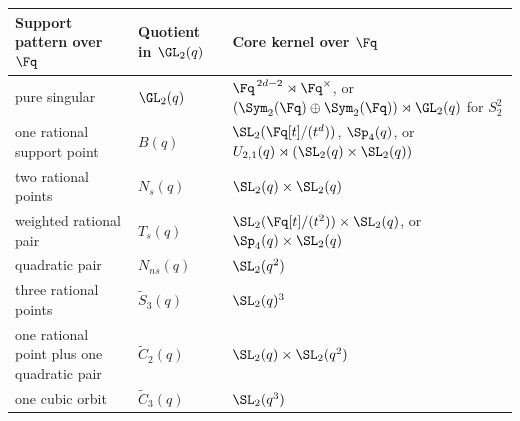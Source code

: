 \begin{tabular}{L{0.22\textwidth} L{0.22\textwidth} L{0.36\textwidth}}
\toprule
Support pattern over \(\Fq\) & Quotient in \(\GL_2(q)\) & Core kernel over \(\Fq\) \\
\midrule
pure singular &
\(\GL_2(q)\) &
\(\Fq^{\,2d-2}\rtimes \Fq^\times\), or
\((\Sym_2(\Fq)\oplus \Sym_2(\Fq))\rtimes \GL_2(q)\) for \(S_2^2\) \\
one rational support point &
\(B(q)\) &
\(\SL_2(\Fq[t]/(t^d))\), \(\Sp_4(q)\), or
\(U_{2,1}(q)\rtimes (\SL_2(q)\times \SL_2(q))\) \\
two rational points &
\(N_s(q)\) &
\(\SL_2(q)\times \SL_2(q)\) \\
weighted rational pair &
\(T_s(q)\) &
\(\SL_2(\Fq[t]/(t^2))\times \SL_2(q)\), or
\(\Sp_4(q)\times \SL_2(q)\) \\
quadratic pair &
\(N_{ns}(q)\) &
\(\SL_2(q^2)\) \\
three rational points &
\(\widetilde{S}_3(q)\) &
\(\SL_2(q)^3\) \\
one rational point plus one quadratic pair &
\(\widetilde{C}_2(q)\) &
\(\SL_2(q)\times \SL_2(q^2)\) \\
one cubic orbit &
\(\widetilde{C}_3(q)\) &
\(\SL_2(q^3)\) \\
\bottomrule
\end{tabular}
